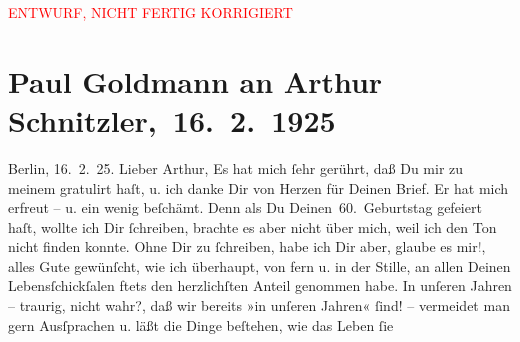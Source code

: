 
\begin{center}
            \textcolor{red}{ENTWURF, NICHT FERTIG KORRIGIERT}
                      \end{center}
            
         \renewcommand{\erwaehnteOrte}{Orte: Berlin, Wien}
         \renewcommand{\erwaehnteWerke}{Werke: Berliner Theater. (»Der Schleier der Beatrice« von Arthur Schnitzler.), Der Schleier der Beatrice. Schauspiel in fünf Akten, Lebendige Stunden. Vier Einakter, Neue Freie Presse, Stunde des Erkennens}
               \section[ Paul Goldmann an Arthur Schnitzler, 16. 2. 1925]{ Paul Goldmann an Arthur Schnitzler, 16. 2. 1925}\nopagebreak{}\rehead{ }\begin{ledgroupsized}[t]{13cm}\normalsize\beginnumbering \toendnotes[C]{\smallbreak\pagebreak[2]} 
\toendnotes[C]{\smallbreak}\pstart
           {\pb}Berlin, 16. 2. 25.\pend
           \pstart{}Lieber Arthur,\pend\pstart
           Es hat mich ſehr gerührt, daß Du mir zu meinem \label{K_L03478-1v}\label{K_L03478-1h} gratulirt haſt, u. ich danke Dir von Herzen für Deinen Brief. Er hat mich
               erfreut – u. ein wenig beſchämt. Denn als Du \label{K_L03478-2v}\label{K_L03478-2h} Deinen 60. Geburtstag gefeiert haſt, wollte ich Dir ſchreiben, brachte es
               aber nicht über mich, weil ich den Ton nicht finden konnte. Ohne Dir zu ſchreiben,
               habe ich Dir aber, glaube es mir\textcolor{gray}{!}, alles Gute gewünſcht, wie ich
               überhaupt, von fern {\pb}u. in  der Stille, an allen Deinen Lebensſchickſalen
               ftets den herzlichſten Anteil genommen habe.\pend
           \pstart
           In unſeren Jahren – traurig, nicht wahr?, daß wir bereits »in unſeren Jahren« ſind! –
               vermeidet man gern Ausſprachen u. läßt die Dinge beſtehen, wie das Leben ſie

\end{ledgroupsized}

